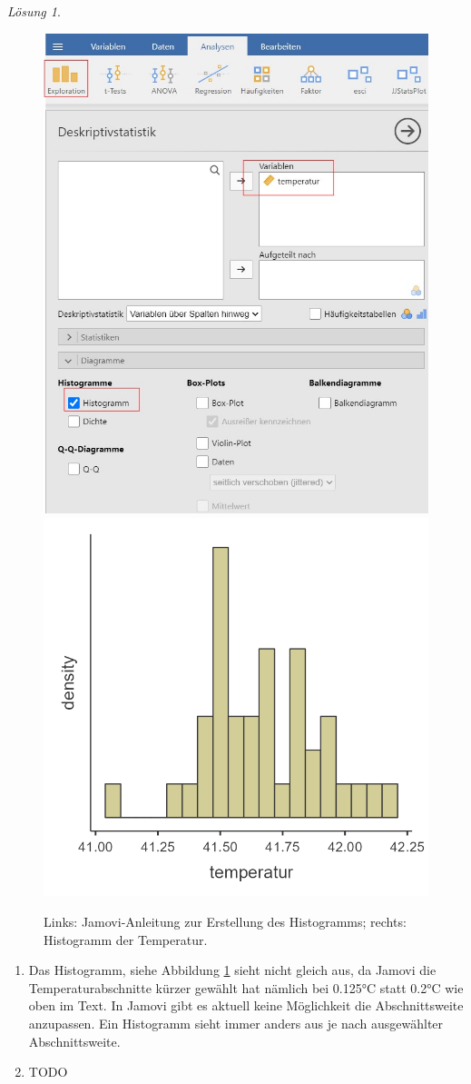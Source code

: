 \documentclass[
]{book}
\theoremstyle{definition}
\theoremstyle{definition}
\theoremstyle{definition}
\theoremstyle{definition}
\theoremstyle{remark}
\newtheorem*{solution}{Lösung}
\begin{document}
\begin{solution}
\leavevmode

\begin{figure}
  \includegraphics[width=0.5\linewidth]{figures/Enten_n40_instr_histogramm} \includegraphics[width=0.5\linewidth]{figures/Enten_n40} \caption{Links: Jamovi-Anleitung zur Erstellung des Histogramms; rechts: Histogramm der Temperatur.}\label{fig:enten-hist-mean-sd}
  \end{figure}

\begin{enumerate}
\def\labelenumi{(\alph{enumi})}
\item
  Das Histogramm, siehe Abbildung \ref{fig:enten-hist-mean-sd} sieht nicht gleich aus, da Jamovi die Temperaturabschnitte kürzer gewählt hat nämlich bei 0.125°C statt 0.2°C wie oben im Text. In Jamovi gibt es aktuell keine Möglichkeit die Abschnittsweite anzupassen. Ein Histogramm sieht immer anders aus je nach ausgewählter Abschnittsweite.
\item
  TODO
\end{enumerate}

\end{solution}
\end{document}
